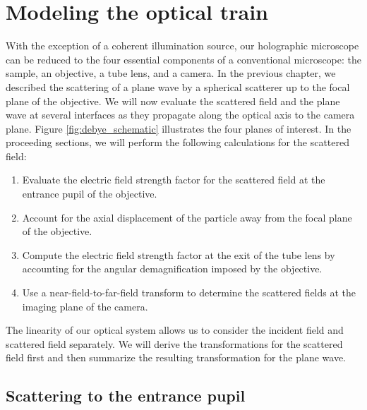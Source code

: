 \section{Modeling the optical train}

With the exception of a coherent illumination source, our holographic microscope
can be reduced to the four essential components of a conventional microscope:
the sample, an objective, a tube lens, and a camera. In the previous chapter,
we described the scattering of a plane wave by a spherical scatterer up to
the focal plane of the objective. We will now evaluate the scattered field and
the plane wave at several interfaces as they propagate along the optical axis
to the camera plane. Figure \ref{fig:debye_schematic} illustrates the four planes
of interest. In the proceeding sections, we will perform the following calculations
for the scattered field:
\begin{enumerate}
\item Evaluate the electric field strength factor for the scattered field at
  the entrance pupil of the objective.
\item Account for the axial displacement of the particle away from the focal
  plane of the objective.
\item Compute the electric field strength factor at the exit of the tube lens
  by accounting for the angular demagnification imposed by the objective.
\item Use a near-field-to-far-field transform to determine the scattered
  fields at the imaging plane of the camera.
\end{enumerate}
The linearity of our optical system allows us to consider the incident field
and scattered field separately. We will derive the transformations for the
scattered field first and then summarize the resulting transformation for the
plane wave.

\subsection{Scattering to the entrance pupil}

